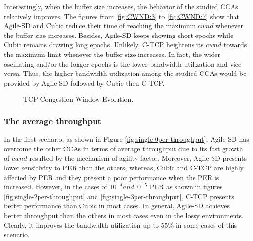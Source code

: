\documentclass[preprint,3p,times,twocolumn,authoryear]{elsarticle}
\begin{document}
Interestingly, when the buffer size increases, the behavior of the studied CCAs relatively improves. The figures from \ref{fig:CWND:3} to \ref{fig:CWND:7} show that Agile-SD and Cubic reduce their time of reaching the maximum $cwnd$ whenever the buffer size increases. Besides, Agile-SD keeps showing short epochs while Cubic remains drawing long epochs. Unlikely, C-TCP heightens its $cwnd$ towards the maximum limit whenever the buffer size increases. In fact, the wider oscillating and/or the longer epochs is the lower bandwidth utilization and vice versa. Thus, the higher bandwidth utilization among the studied CCAs would be provided by Agile-SD followed by Cubic then C-TCP.

\begin{figure*} [t!]
	\centering
	\begin{center}
	\end{center}
	\caption{TCP Congestion Window Evolution.}
	\label{fig:CWND}
\end{figure*}

\subsubsection{The average throughput}
In the first scenario, as shown in Figure \ref{fig:single-0per-throughput}, Agile-SD has overcome the other CCAs in terms of average throughput due to its fast growth of $cwnd$ resulted by the mechanism of agility factor. Moreover, Agile-SD presents lower sensitivity to PER than the others, whereas, Cubic and C-TCP are highly affected by PER and they present a poor performance when the PER is increased. However, in the cases of $10^{-4} and 10^{-5}$ PER as shown in figures \ref{fig:single-2per-throughput} and \ref{fig:single-3per-throughput}, C-TCP presents better performance than Cubic in most cases. In general, Agile-SD achieves better throughput than the others in most cases even in the lossy environments. Clearly, it improves the bandwidth utilization up to 55\% in some cases of this scenario.
\end{document}
